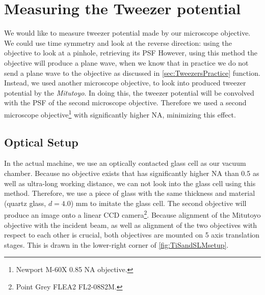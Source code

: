 \section{Measuring the Tweezer potential}\label{sec:MeasuringTweezer}

We would like to measure tweezer potential made by our microscope objective. 
We could use time symmetry and look at the reverse direction: using the objective to look at a pinhole, retrieving its \acf{PSF} \cite{Knottnerus2018,Sortais2007}
However, using this method the objective will produce a plane wave, when we know that in practice we do not send a plane wave to the objective as discussed in \cref{sec:TweezersPractice}
function. 
Instead, we used another microscope objective, to look into produced tweezer potential by the \textit{Mitutoyo}. 
In doing this, the tweezer potential will be convolved with the \ac{PSF} of the second microscope objective\cite{Baumgaertner2017}.
Therefore we used a second microscope objective\footnote{Newport M-60X 0.85 NA objective.} with significantly higher \ac{NA}, minimizing this effect. 

\subsection{Optical Setup}

In the actual machine, we use an optically contacted glass cell as our vacuum chamber. Because no objective exists that has significantly higher NA than 0.5 as well as ultra-long working distance, we can not look into the glass cell using this method. Therefore, we use a piece of glass with the same thickness and material (quartz glass, $d = 4.0$) mm to imitate the glass cell. The second objective will produce an image onto a linear \ac{CCD} camera\footnote{Point Grey FLEA2 FL2-08S2M.}. Because alignment of the Mitutoyo objective with the incident beam, as well as alignment of the two objectives with respect to each other is crucial, both objectives are mounted on 5 axis translation stages. 
This is drawn in the lower-right corner of \cref{fig:TiSandSLMsetup}.

